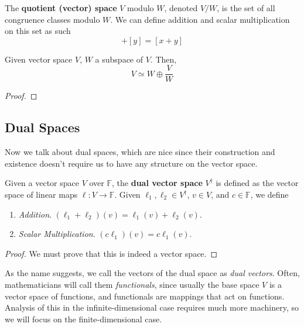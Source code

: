   \begin{definition}
    The \textbf{quotient (vector) space} $V$ modulo $W$, denoted $V/W$, is the set of all congruence classes modulo $W$. We can define addition and scalar multiplication on this set as such 
    \begin{equation}
      [x] + [y] = [x + y]
    \end{equation}
  \end{definition}

  \begin{theorem}
    Given vector space $V$, $W$ a subspace of $V$. Then, 
    \begin{equation}
      V \simeq W \oplus \frac{V}{W}
    \end{equation}
  \end{theorem}
  \begin{proof}
    
  \end{proof}

\subsection{Dual Spaces}

  Now we talk about dual spaces, which are nice since their construction and existence doesn't require us to have any structure on the vector space. 

  \begin{definition}
    Given a vector space $V$ over $\mathbb{F}$, the \textbf{dual vector space} $V^\dagger$ is defined as the vector space of linear maps $\ell: V \to \mathbb{F}$. Given $\ell_1, \ell_2 \in V^\dagger$, $v \in V$, and $c \in \mathbb{F}$, we define
    \begin{enumerate}
      \item \textit{Addition}. $(\ell_1 + \ell_2)(v) = \ell_1 (v) + \ell_2 (v)$. 
      \item \textit{Scalar Multiplication}. $(c \ell_1)(v) = c \ell_1 (v)$. 
    \end{enumerate}
  \end{definition}
  \begin{proof}
    We must prove that this is indeed a vector space. 
  \end{proof}

  As the name suggests, we call the vectors of the dual space as \textit{dual vectors}. Often, mathematicians will call them \textit{functionals}, since usually the base space $V$ is a vector space of functions, and functionals are mappings that act on functions. Analysis of this in the infinite-dimensional case requires much more machinery, so we will focus on the finite-dimensional case. 

